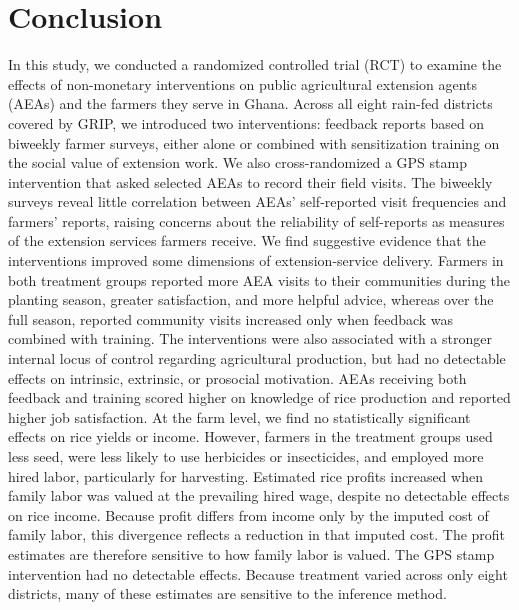 \documentclass[11pt]{article}
\begin{document}
\section{Conclusion}\label{sec:conclusion}

In this study, we conducted a randomized controlled trial (RCT) to examine the effects of non-monetary interventions on public agricultural extension agents (AEAs) and the farmers they serve in Ghana. Across all eight rain-fed districts covered by GRIP, we introduced two interventions: feedback reports based on biweekly farmer surveys, either alone or combined with sensitization training on the social value of extension work. We also cross-randomized a GPS stamp intervention that asked selected AEAs to record their field visits. The biweekly surveys reveal little correlation between AEAs’ self-reported visit frequencies and farmers’ reports, raising concerns about the reliability of self-reports as measures of the extension services farmers receive. We find suggestive evidence that the interventions improved some dimensions of extension-service delivery. Farmers in both treatment groups reported more AEA visits to their communities during the planting season, greater satisfaction, and more helpful advice, whereas over the full season, reported community visits increased only when feedback was combined with training. The interventions were also associated with a stronger internal locus of control regarding agricultural production, but had no detectable effects on intrinsic, extrinsic, or prosocial motivation. AEAs receiving both feedback and training scored higher on knowledge of rice production and reported higher job satisfaction. At the farm level, we find no statistically significant effects on rice yields or income. However, farmers in the treatment groups used less seed, were less likely to use herbicides or insecticides, and employed more hired labor, particularly for harvesting. Estimated rice profits increased when family labor was valued at the prevailing hired wage, despite no detectable effects on rice income. Because profit differs from income only by the imputed cost of family labor, this divergence reflects a reduction in that imputed cost. The profit estimates are therefore sensitive to how family labor is valued. The GPS stamp intervention had no detectable effects. Because treatment varied across only eight districts, many of these estimates are sensitive to the inference method.
\end{document}
